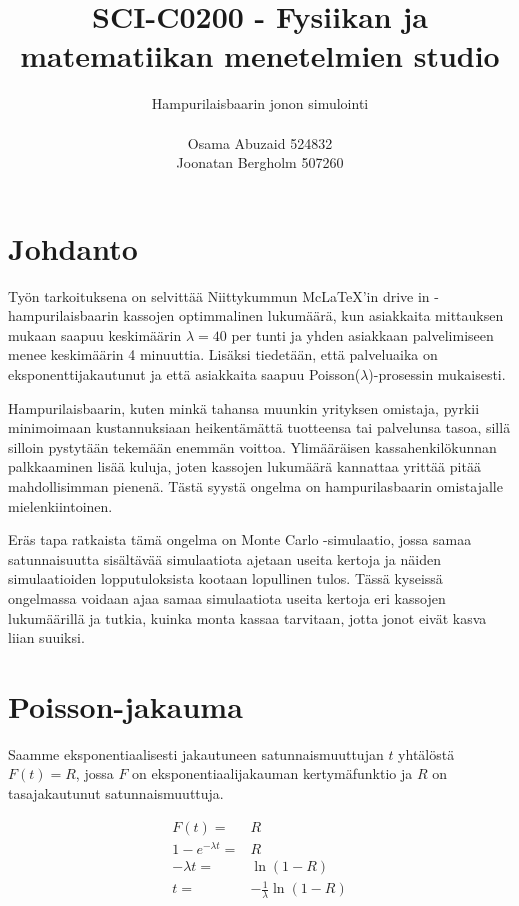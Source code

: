 \documentclass{article}     %
\title{SCI-C0200 - Fysiikan ja matematiikan menetelmien studio}
\author{Hampurilaisbaarin jonon simulointi\\ \\ Osama Abuzaid 524832 \\ Joonatan Bergholm 507260}
\begin{document}
\maketitle
\newpage

\pagestyle{fancy}
\lstset{language = Matlab}

\section*{Johdanto}

Työn tarkoituksena on selvittää Niittykummun Mc\LaTeX'in drive in -hampurilaisbaarin kassojen optimmalinen lukumäärä, kun asiakkaita mittauksen mukaan saapuu keskimäärin $\lambda = 40$ per tunti ja yhden asiakkaan palvelimiseen menee keskimäärin 4 minuuttia. Lisäksi tiedetään, että palveluaika on eksponenttijakautunut ja että asiakkaita saapuu Poisson($\lambda$)-prosessin mukaisesti. \par
Hampurilaisbaarin, kuten minkä tahansa muunkin yrityksen omistaja, pyrkii minimoimaan kustannuksiaan heikentämättä tuotteensa tai palvelunsa tasoa, sillä silloin pystytään tekemään enemmän voittoa. Ylimääräisen kassahenkilökunnan palkkaaminen lisää kuluja, joten kassojen lukumäärä kannattaa yrittää pitää mahdollisimman pienenä. Tästä syystä ongelma on hampurilasbaarin omistajalle mielenkiintoinen. \par
Eräs tapa ratkaista tämä ongelma on Monte Carlo -simulaatio, jossa samaa satunnaisuutta sisältävää simulaatiota ajetaan useita kertoja ja näiden simulaatioiden lopputuloksista kootaan lopullinen tulos. Tässä kyseissä ongelmassa voidaan ajaa samaa simulaatiota useita kertoja eri kassojen lukumäärillä ja tutkia, kuinka monta kassaa tarvitaan, jotta jonot eivät kasva liian suuiksi.


\section*{Poisson-jakauma}

Saamme eksponentiaalisesti jakautuneen satunnaismuuttujan $t$ yhtälöstä $F(t) = R$, jossa $F$ on eksponentiaalijakauman kertymäfunktio ja $R$ on tasajakautunut satunnaismuuttuja.

\begin{align*}
F(t) =& R \\
1-e^{-\lambda t} =& R \\
-\lambda t =& \ln (1 - R) \\
t =& -\frac{1}{\lambda} \ln (1 - R)
\end{align*}
\end{document}
